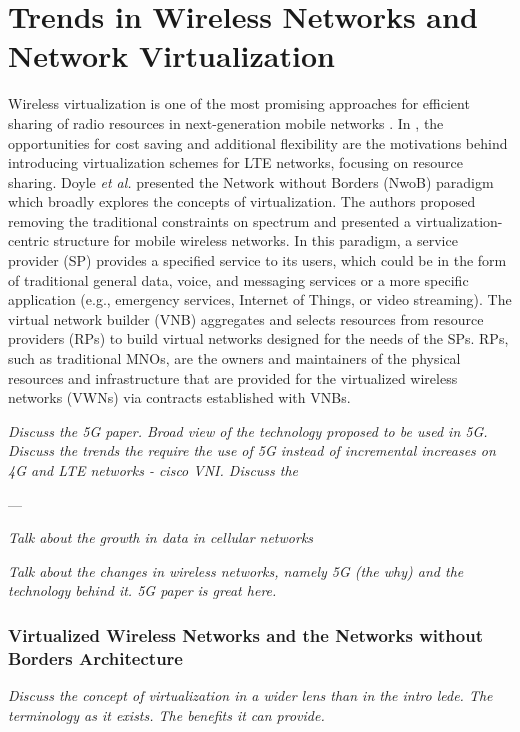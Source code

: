 \documentclass[12pt,dvips]{report}
\begin{document}
\section{Trends in Wireless Networks and Network Virtualization} \label{sec:netreview}

Wireless virtualization is one of the most promising approaches for efficient sharing of radio resources in next-generation mobile networks \cite{6824752}.  In \cite{6553675, 6571315}, the opportunities for cost saving and additional flexibility are the motivations behind introducing virtualization schemes for LTE networks, focusing on resource sharing.  Doyle \textit{et al.} \cite{6737248} presented the Network without Borders (NwoB) paradigm which broadly explores the concepts of virtualization.  The authors proposed removing the traditional constraints on spectrum and presented a virtualization-centric structure for mobile wireless networks.  In this paradigm, a service provider (SP) provides a specified service to its users, which could be in the form of traditional general data, voice, and messaging services or a more specific application (e.g., emergency services, Internet of Things, or video streaming).  The virtual network builder (VNB) aggregates and selects resources from resource providers (RPs) to build virtual networks designed for the needs of the SPs.  RPs, such as traditional MNOs, are the owners and maintainers of the physical resources and infrastructure that are provided for the virtualized wireless networks (VWNs) via contracts established with VNBs.

\textit{Discuss the 5G paper.  Broad view of the technology proposed to be used in 5G.  Discuss the trends the require the use of 5G instead of incremental increases on 4G and LTE networks - cisco VNI.  Discuss the }

---

\textit{Talk about the growth in data in cellular networks}

\textit{Talk about the changes in wireless networks, namely 5G (the why) and the technology behind it.  5G paper is great here.}

\subsubsection{Virtualized Wireless Networks and the Networks without Borders Architecture}

\textit{Discuss the concept of virtualization in a wider lens than in the intro lede.  The terminology as it exists.  The benefits it can provide.}
\end{document}
